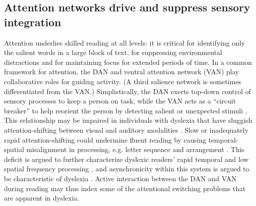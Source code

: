 \subsection{Attention networks drive and suppress sensory integration} 
Attention underlies skilled reading at all levels: it is critical for identifying only the salient words in a large block of text, for suppressing environmental distractions and for maintaining focus for extended periods of time. In a common framework for attention, the DAN and ventral attention network (VAN) play collaborative roles for guiding activity. (A third salience network is sometimes differentiated from the VAN.) Simplistically, the DAN exerts top-down control of sensory processes to keep a person on task, while the VAN acts as a ``circuit breaker'' to help reorient the person by detecting salient or unexpected stimuli \citep{Corbetta2002, Vossel2014}. This relationship may be impaired in individuals with dyslexia that have sluggish attention-shifting between visual and auditory modalities \citep{Harrar2014}. Slow or inadequately rapid attention-shifting could undermine fluent reading by causing temporal-spatial misalignment in processing, e.g. letter sequence and arrangement \citep{Lallier2009}. This deficit is argued to further characterize dyslexic readers' rapid temporal and low spatial frequency processing \citep{Witton1998}, and asynchronicity within this system is argued to be characteristic of dyslexia \citep{Lallier2009}. Active interaction between the DAN and VAN during reading may thus index some of the attentional switching problems that are apparent in dyslexia. 

